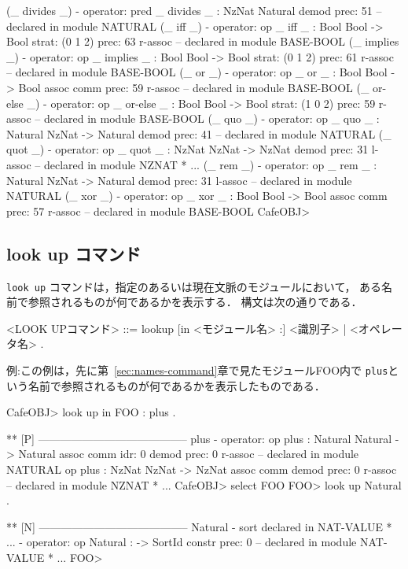 \documentclass[a4paper,oneside,10pt]{memoir}
\newenvironment{vvtm}%
{\parskip=0pt\lineskip=0pt\begin{center}\begin{minipage}{0.8\textwidth}\begin{snugshade}}%
  {\end{snugshade}\end{minipage}\end{center}}
\begin{document}
\begin{vvtm}
\begin{examplev}
(_ divides _) 
  - operator:
    pred _ divides _ : NzNat Natural  { demod prec: 51 }
        -- declared in module NATURAL
(_ iff _) 
  - operator:
    op _ iff _ : Bool Bool -> Bool { strat: (0 1 2) prec: 63 r-assoc }
        -- declared in module BASE-BOOL
(_ implies _) 
  - operator:
    op _ implies _ : Bool Bool -> Bool { strat: (0 1 2) prec: 61
                                         r-assoc }
        -- declared in module BASE-BOOL
(_ or _)  
  - operator:
    op _ or _ : Bool Bool -> Bool { assoc comm prec: 59 r-assoc }
        -- declared in module BASE-BOOL
(_ or-else _) 
  - operator:
    op _ or-else _ : Bool Bool -> Bool { strat: (1 0 2) prec: 59
                                         r-assoc }
        -- declared in module BASE-BOOL
(_ quo _) 
  - operator:
    op _ quo _ : Natural NzNat -> Natural { demod prec: 41 }
        -- declared in module NATURAL
(_ quot _) 
  - operator:
    op _ quot _ : NzNat NzNat -> NzNat { demod prec: 31 l-assoc }
        -- declared in module NZNAT * { ... }
(_ rem _) 
  - operator:
    op _ rem _ : Natural NzNat -> Natural { demod prec: 31 l-assoc }
        -- declared in module NATURAL
(_ xor _) 
  - operator:
    op _ xor _ : Bool Bool -> Bool { assoc comm prec: 57 r-assoc }
        -- declared in module BASE-BOOL
CafeOBJ> 
\end{examplev}
\end{vvtm}

\subsection{look up コマンド}
\label{sec:lookup-command}
\texttt{look up} コマンドは，指定のあるいは現在文脈のモジュールにおいて，%
ある名前で参照されるものが何であるかを表示する．
構文は次の通りである．
\begin{vvtm}
\begin{simplev}
<LOOK UPコマンド>    ::= lookup [in <モジュール名> :] <識別子> | <オペレータ名> .
\end{simplev}
\end{vvtm}
例:この例は，先に第~\ref{sec:names-command}章で見たモジュールFOO内で%
\texttt{plus}という名前で参照されるものが何であるかを表示したものである．
\begin{vvtm}
\begin{simplev}
CafeOBJ> look up in FOO : plus .

** [P] -----------------------------------------
plus      
  - operator:
    op plus : Natural Natural -> Natural { assoc comm idr: 0 demod
                                           prec: 0 r-assoc }
        -- declared in module NATURAL
    op plus : NzNat NzNat -> NzNat { assoc comm demod prec: 0 r-assoc }
        -- declared in module NZNAT * { ... }
CafeOBJ> select FOO
FOO> look up Natural
.

** [N] -----------------------------------------
Natural   
  - sort declared in NAT-VALUE * { ... }
  - operator:
    op Natural : -> SortId { constr prec: 0 }
        -- declared in module NAT-VALUE * { ... }
FOO> 
\end{simplev}
\end{vvtm}
\end{document}
